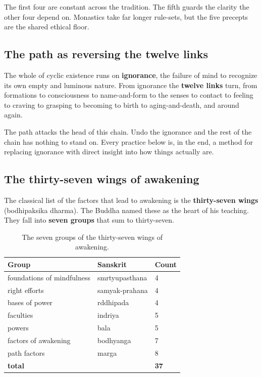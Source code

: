 The first four are constant across the tradition. The fifth guards the clarity the other four depend on. Monastics take far longer rule-sets, but the five precepts are the shared ethical floor.

\subsection{The path as reversing the twelve links}

The whole of cyclic existence runs on \textbf{ignorance}, the failure of mind to recognize its own empty and luminous nature. From ignorance the \textbf{twelve links} turn, from formations to consciousness to name-and-form to the senses to contact to feeling to craving to grasping to becoming to birth to aging-and-death, and around again.

The path attacks the head of this chain. Undo the ignorance and the rest of the chain has nothing to stand on. Every practice below is, in the end, a method for replacing ignorance with direct insight into how things actually are.

\subsection{The thirty-seven wings of awakening}

The classical list of the factors that lead to awakening is the \textbf{thirty-seven wings} (bodhipaksika dharma). The Buddha named these as the heart of his teaching. They fall into \textbf{seven groups} that sum to thirty-seven.

\begin{longtable}{l L{6.5cm} l}
\caption{The seven groups of the thirty-seven wings of awakening.}\\
\toprule
\textbf{Group} & \textbf{Sanskrit} & \textbf{Count} \\
\midrule
foundations of mindfulness & smrtyupasthana & 4 \\
right efforts & samyak-prahana & 4 \\
bases of power & rddhipada & 4 \\
faculties & indriya & 5 \\
powers & bala & 5 \\
factors of awakening & bodhyanga & 7 \\
path factors & marga & 8 \\
\midrule
\textbf{total} & & \textbf{37} \\
\bottomrule
\end{longtable}

